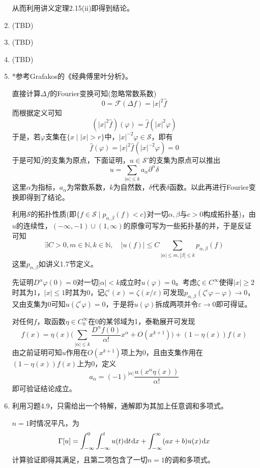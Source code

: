 \documentclass[a4paper,UTF8,fontset=windows]{ctexart}
\newcommand*{\dr}{\hspace{0.07em}\mathrm{d}}
\begin{document}
\begin{enumerate}
    从而利用讲义定理2.15(ii)即得到结论。
    \item (TBD)
    \item (TBD)
    \item (TBD)
    
    \item 
    *参考Grafakos的《经典傅里叶分析》。
    
    直接计算$\Delta f$的Fourier变换可知(忽略常数系数)
    $$0=\mathcal{F}(\Delta f)=|x|^2\hat{f}$$
    而根据定义可知
    $$(|x|^2\hat{f})(\varphi)=\hat{f}(|x|^2\varphi)$$
    于是，若$\varphi$支集在$\{x\mid|x|>r\}$中，$|x|^{-2}\varphi\in\mathcal{S}$，即有
    $$\hat{f}(\varphi)=|x|^2\hat{f}(|x|^{-2}\varphi)=0$$
    于是可知$\hat{f}$的支集为原点，下面证明，$u\in\mathcal{S}'$的支集为原点可以推出
    $$u=\sum_{|\alpha|\le k}a_\alpha\partial^\alpha\delta$$
    这里$\alpha$为指标，$a_\alpha$为常数系数，$k$为自然数，$\delta$代表$\delta$函数。以此再进行Fourier变换即得到了结论。

    利用$\mathcal{S}$的拓扑性质(即$\{f\in\mathcal{S}\mid p_{\alpha,\beta}(f)<c\}$对一切$\alpha,\beta$与$c>0$构成拓扑基)，由$u$的连续性，$(-\infty,-1)\cup(1,\infty)$的原像可写为一些拓扑基的并，于是反证可知
    $$\exists C>0,m\in\mathbb{N},k\in\mathbb{N},\quad|u(f)|\le C\sum_{|\alpha|\le m,|\beta|\le k}p_{\alpha,\beta}(f)$$
    这里$p_{\alpha,\beta}$如讲义1.7节定义。

    先证明$D^\alpha\varphi(0)=0$对一切$|\alpha|<k$成立时$u(\varphi)=0$。考虑$\zeta\in C^\infty$使得$|x|\ge2$时其为1，$|x|\le1$时其为0，记$\zeta^\varepsilon(x)=\zeta(x/\varepsilon)$可发现$p_{\alpha,\beta}(\zeta^\varepsilon\varphi-\varphi)\to0$，又由支集为0可知$u(\zeta^\varepsilon\varphi)=0$，于是将$u(\varphi)$拆成两项并令$\varepsilon\to0$即可得证。

    对任何$f$，取函数$\eta\in C_0^\infty$在0的某邻域为1，泰勒展开可发现
    $$f(x)=\eta(x)\bigg(\sum_{|\alpha|\le k}\frac{D^\alpha f(0)}{\alpha!}x^\alpha+O(x^{k+1})\bigg)+(1-\eta(x))f(x)$$
    由之前证明可知$u$作用在$O(x^{k+1})$项上为0，且由支集作用在$(1-\eta(x))f(x)$上为0，定义
    $$a_\alpha=(-1)^{|\alpha|}\frac{u(x^\alpha\eta(x))}{\alpha!}$$
    即可验证结论成立。

    
    \item 利用习题4.9，只需给出一个特解，通解即为其加上任意调和多项式。
    
    $n=1$时情况平凡，为
    $$\Gamma[u]=\int_{-\infty}^0\int_{-\infty}^tu(t)\dr t\dr x+\int_{-\infty}^\infty(ax+b)u(x)\dr x$$
    计算验证即得其满足，且第二项包含了一切$n=1$的调和多项式。
    

\end{enumerate}
\end{document}
